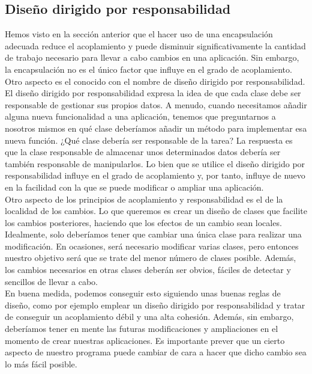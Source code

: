 \documentclass[11pt,a4paper]{article}
\begin{document}
\subsection{Diseño dirigido por responsabilidad}
Hemos visto en la sección anterior que el hacer uso de una encapsulación adecuada reduce el
acoplamiento y puede disminuir significativamente la cantidad de trabajo necesario para llevar a
cabo cambios en una aplicación. Sin embargo, la encapsulación no es el único factor que influye
en el grado de acoplamiento. Otro aspecto es el conocido con el nombre de diseño dirigido por
responsabilidad.\\
El diseño dirigido por responsabilidad expresa la idea de que cada clase debe ser responsable de
gestionar sus propios datos.
A menudo, cuando necesitamos añadir alguna nueva funcionalidad a una aplicación, tenemos que preguntarnos a nosotros mismos en qué clase deberíamos añadir
un método para implementar esa nueva función. ¿Qué clase debería ser responsable de la tarea?
La respuesta es que la clase responsable de almacenar unos determinados datos debería ser también
responsable de manipularlos. Lo bien que se utilice el diseño dirigido por responsabilidad influye en el grado de acoplamiento y,
por tanto, influye de nuevo en la facilidad con la que se puede modificar o ampliar una aplicación.
\\
Otro aspecto de los principios de acoplamiento y responsabilidad es el de la localidad de los cambios.
Lo que queremos es crear un diseño de clases que facilite los cambios posteriores, haciendo
que los efectos de un cambio sean locales.
Idealmente, solo deberíamos tener que cambiar una única clase para realizar una modificación.
En ocasiones, será necesario modificar varias clases, pero entonces nuestro objetivo será que se
trate del menor número de clases posible. Además, los cambios necesarios en otras clases deberán
ser obvios, fáciles de detectar y sencillos de llevar a cabo.\\
En buena medida, podemos conseguir esto siguiendo unas buenas reglas de diseño, como por
ejemplo emplear un diseño dirigido por responsabilidad y tratar de conseguir un acoplamiento
débil y una alta cohesión. Además, sin embargo, deberíamos tener en mente las futuras modificaciones
y ampliaciones en el momento de crear nuestras aplicaciones. Es importante prever que
un cierto aspecto de nuestro programa puede cambiar de cara a hacer que dicho cambio sea lo más
fácil posible.
\\
\\
\end{document}
